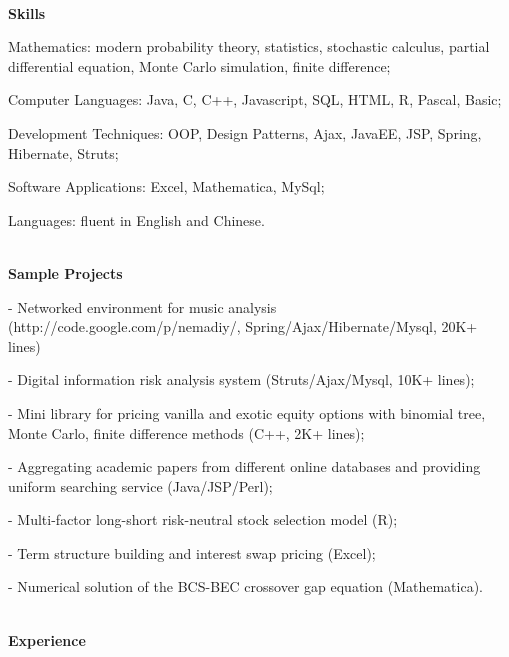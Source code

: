 \documentclass[9.5pt]{article}
\begin{document}
\hrulefill\\
\vspace{0.12in}
{\large \textbf{Skills}}

\begin{description*}
\item[Mathematics:]
modern probability theory, statistics, stochastic calculus, partial differential equation, Monte Carlo simulation,  finite difference;  
\item[Computer Languages:]
 Java, C, C++,  Javascript, SQL, HTML,    R, Pascal,  Basic;
 \item[Development Techniques:]
OOP, Design Patterns,  Ajax,  JavaEE,  JSP, Spring, Hibernate, Struts;
\item[Software Applications:]
Excel,   Mathematica, MySql;
\item[Languages:]
fluent in English and Chinese.

\end{description*}
\hrulefill\\
\vspace{0.12in}
{\large \textbf{Sample Projects}}

\begin{itemize*}
\item[-] Networked environment for music analysis ({http://code.google.com/p/nemadiy/}, Spring/Ajax/Hibernate/Mysql, 20K+ lines)
\item[-] Digital information risk analysis system (Struts/Ajax/Mysql, 10K+ lines);
\item[-] Mini library for pricing vanilla and exotic equity options with binomial tree, Monte Carlo, finite difference methods (C++, 2K+ lines);
\item[-] Aggregating academic papers from different online databases and providing uniform searching service (Java/JSP/Perl);
\item[-] Multi-factor long-short risk-neutral stock selection model (R);
\item[-] Term structure building and interest swap pricing (Excel); 
\item[-] Numerical solution of the BCS-BEC crossover gap equation (Mathematica).
\end{itemize*}
\hrulefill\\
\vspace{0.12in}
{\large \textbf{Experience}}
\end{document}
